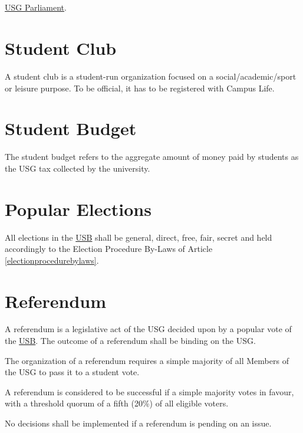 \section{}
 \hyperref[USGParliamentDef]{USG Parliament}.

\section{Student Club}
A student club is a student-run organization focused on a social/academic/sport or leisure purpose. To be official, it has to be registered with Campus Life.

\section{Student Budget}
The student budget refers to the aggregate amount of money paid by students as the USG tax collected by the university.

\section{Popular Elections}
All elections in the \hyperref[studentbody]{USB} shall be general, direct, free, fair, secret and held accordingly to the Election Procedure By-Laws of Article \ref{electionprocedurebylaws}.

\section{Referendum}
\label{referendum}
A referendum is a legislative act of the USG decided upon by a popular vote of the \hyperref[studentbody]{USB}. The outcome of a referendum shall be binding on the USG.
\begin{parenum} 
\item
The organization of a referendum requires a simple majority of all Members of the USG to pass it to a student vote. 
\item
A referendum is considered to be successful if a simple majority votes in favour, with a threshold quorum of a fifth (20\%) of all eligible voters.
\item
No decisions shall be implemented if a referendum is pending on an issue.
\end{parenum}


